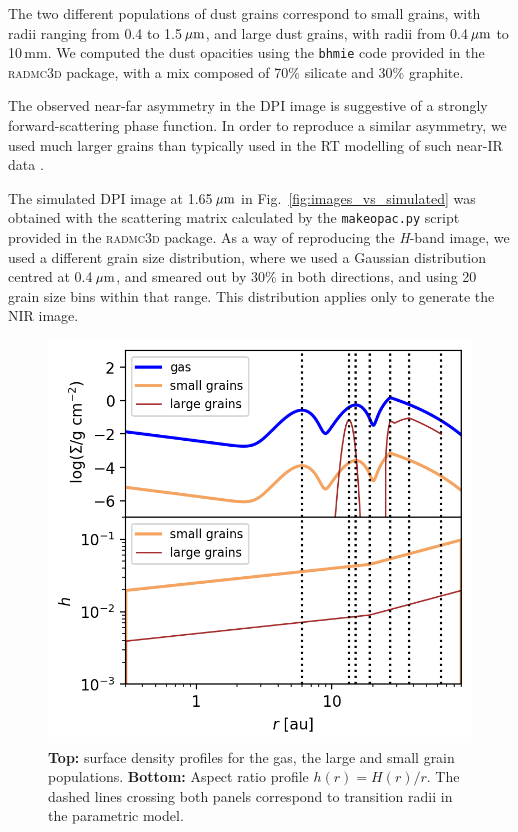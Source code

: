 \documentclass[letters,usenatbib,times]{mnras}
\begin{document}
The two different populations of dust grains correspond to small grains, with radii ranging from 0.4 to 1.5\,$\hbox{$\mu$m}$, and large dust grains, with radii from 0.4\,$\hbox{$\mu$m}$ to 10\,mm. We computed the dust opacities using the {\tt bhmie} code provided in the \textsc{radmc3d} package, with a mix composed of 70\% silicate and 30\% graphite. 

The observed near-far asymmetry in the DPI image is suggestive of a strongly forward-scattering phase function. In order to reproduce a similar asymmetry, we used much larger grains than typically used in the RT modelling of such near-IR data \citep[e.g.,][]{2018MNRAS.477.5104C}. 

The simulated DPI image at 1.65\,$\hbox{$\mu$m}$ in Fig.~\ref{fig:images_vs_simulated} was obtained with the scattering matrix calculated by the {\tt makeopac.py} script provided in the \textsc{radmc3d} package. As a way of reproducing the \textit{H}-band image, we used a different grain size distribution, where we used a Gaussian distribution centred at 0.4\,$\hbox{$\mu$m}$, and smeared out by 30\% in both directions, and using 20 grain size bins within that range. This distribution applies only to generate the NIR image.

\begin{figure}
	\includegraphics[width=\columnwidth]{allprofiles.png}
        \caption{{\bf Top:} surface density profiles for the gas, the large and small grain populations. {\bf Bottom:} Aspect ratio profile $h(r)= H(r)/r$. The dashed lines crossing both panels correspond to transition radii in the parametric model.}
    \label{fig:profiles}
\end{figure}
\end{document}
